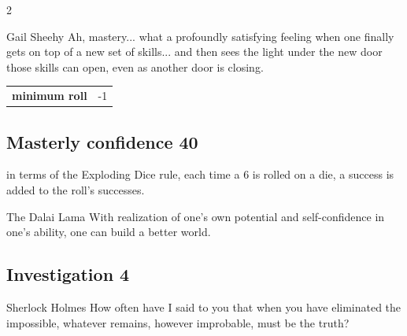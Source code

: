 \begin{multicols}{2}
\begin{tcolorbox}
\begin{pquote}{Gail Sheehy}
Ah, mastery... what a profoundly satisfying feeling when one finally gets on top of a new set of skills... and then sees the light under the new door those skills can open, even as another door is closing.
\end{pquote}

\vspace{3mm}

\begin{tabular}{@{}ll@{}}
    \textbf{minimum roll} & -1\\
\end{tabular}


\end{tcolorbox}

\begin{tcolorbox}
    \subsection*{Masterly confidence \hfill \small{40 }}
    \tcblower
in terms of the Exploding Dice rule, each time a 6 is rolled on a die, a success is added to the roll's successes.

\begin{pquote}{The Dalai Lama}
With realization of one’s own potential and self-confidence in one’s ability, one can build a better world.
\end{pquote}

\vspace{3mm}



\end{tcolorbox}

\begin{tcolorbox}
    \subsection*{Investigation \hfill \small{4 }}
    \tcblower


\begin{pquote}{Sherlock Holmes}
How often have I said to you that when you have eliminated the impossible, whatever remains, however improbable, must be the truth?
\end{pquote}


\end{tcolorbox}
\end{multicols}
